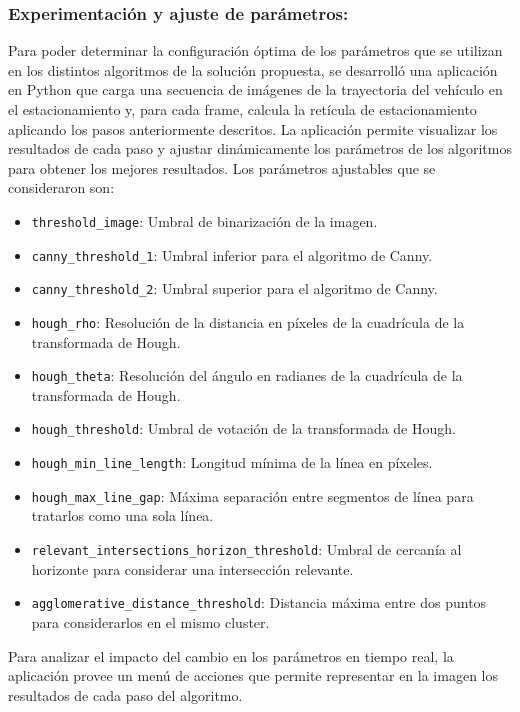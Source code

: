 \subsubsection{Experimentación y ajuste de parámetros:}\label{subsec:experimentacion-y-ajuste-de-parametros:}
\noindent
Para poder determinar la configuración óptima de los parámetros que se utilizan en los distintos algoritmos de la solución propuesta,
se desarrolló una aplicación en Python que carga una secuencia de imágenes de la trayectoria del vehículo en el estacionamiento y, para cada frame,
calcula la retícula de estacionamiento aplicando los pasos anteriormente descritos.
La aplicación permite visualizar los resultados de cada paso y ajustar dinámicamente los parámetros de los algoritmos para obtener los mejores resultados.
Los parámetros ajustables que se consideraron son:
\begin{itemize}
    \item \texttt{threshold\_image}: Umbral de binarización de la imagen.
    \item \texttt{canny\_threshold\_1}: Umbral inferior para el algoritmo de Canny.
    \item \texttt{canny\_threshold\_2}: Umbral superior para el algoritmo de Canny.
    \item \texttt{hough\_rho}: Resolución de la distancia en píxeles de la cuadrícula de la transformada de Hough.
    \item \texttt{hough\_theta}: Resolución del ángulo en radianes de la cuadrícula de la transformada de Hough.
    \item \texttt{hough\_threshold}: Umbral de votación de la transformada de Hough.
    \item \texttt{hough\_min\_line\_length}: Longitud mínima de la línea en píxeles.
    \item \texttt{hough\_max\_line\_gap}: Máxima separación entre segmentos de línea para tratarlos como una sola línea.
    \item \texttt{relevant\_intersections\_horizon\_threshold}: Umbral de cercanía al horizonte para considerar una intersección relevante.
    \item \texttt{agglomerative\_distance\_threshold}: Distancia máxima entre dos puntos para considerarlos en el mismo cluster.
\end{itemize}
Para analizar el impacto del cambio en los parámetros en tiempo real, la aplicación provee un menú de acciones que permite
representar en la imagen los resultados de cada paso del algoritmo.


